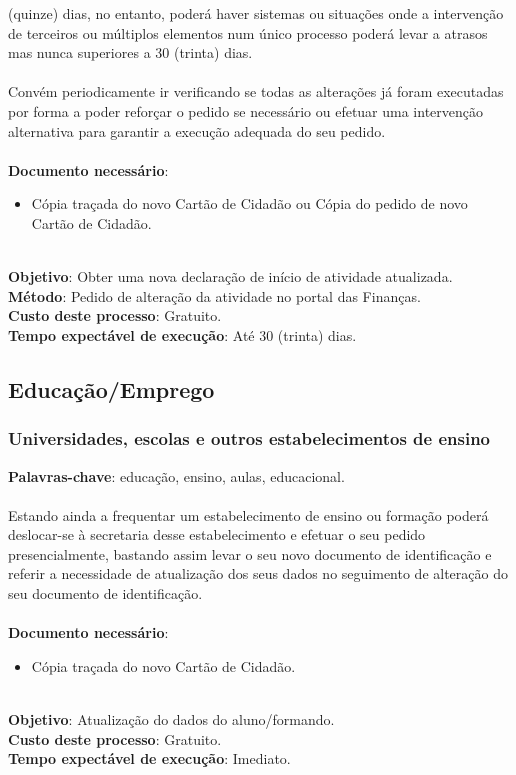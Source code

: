(quinze) dias, no entanto, poderá haver sistemas ou situações onde a
intervenção de terceiros ou múltiplos elementos num único processo
poderá levar a atrasos mas nunca superiores a 30 (trinta) dias. \\
\\
Convém periodicamente ir verificando se todas as alterações já foram
executadas por forma a poder reforçar o pedido se necessário ou efetuar
uma intervenção alternativa para garantir a execução adequada do seu
pedido. \\
\\
\textbf{Documento necessário}:
\begin{itemize}
	\item Cópia traçada do novo Cartão de Cidadão ou Cópia do pedido de novo Cartão de Cidadão.
\end{itemize}
\leavevmode\\
\textbf{Objetivo}: Obter uma nova declaração de início de atividade atualizada. \\
\textbf{Método}: Pedido de alteração da atividade no portal das Finanças. \\
\textbf{Custo deste processo}: Gratuito. \\
\textbf{Tempo expectável de execução}: Até 30 (trinta) dias. \\

\subsection{Educação/Emprego}

\subsubsection{Universidades, escolas e outros estabelecimentos de ensino}

\textbf{Palavras-chave}: educação, ensino, aulas, educacional. \\
\\
Estando ainda a frequentar um estabelecimento de ensino ou formação
poderá deslocar-se à secretaria desse estabelecimento e efetuar o seu
pedido presencialmente, bastando assim levar o seu novo documento de
identificação e referir a necessidade de atualização dos seus dados no
seguimento de alteração do seu documento de identificação.\\
\\
\textbf{Documento necessário}:
\begin{itemize}
	\item Cópia traçada do novo Cartão de Cidadão.
\end{itemize}
\leavevmode\\
\textbf{Objetivo}: Atualização do dados do aluno/formando. \\
\textbf{Custo deste processo}: Gratuito. \\
\textbf{Tempo expectável de execução}: Imediato. \\

